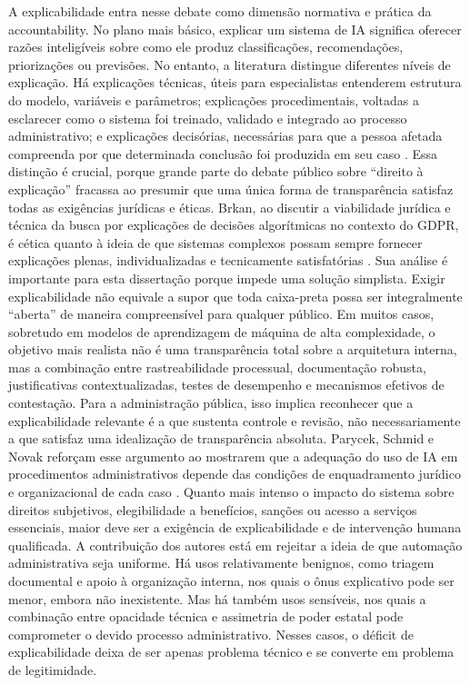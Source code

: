 \documentclass[12pt,a4paper]{article}
\begin{document}
A explicabilidade entra nesse debate como dimensão normativa e prática da accountability. No plano mais básico, explicar um sistema de IA significa oferecer razões inteligíveis sobre como ele produz classificações, recomendações, priorizações ou previsões. No entanto, a literatura distingue diferentes níveis de explicação. Há explicações técnicas, úteis para especialistas entenderem estrutura do modelo, variáveis e parâmetros; explicações procedimentais, voltadas a esclarecer como o sistema foi treinado, validado e integrado ao processo administrativo; e explicações decisórias, necessárias para que a pessoa afetada compreenda por que determinada conclusão foi produzida em seu caso \autocite{brkan2020legal} \autocite{parycek2023artificial}. Essa distinção é crucial, porque grande parte do debate público sobre “direito à explicação” fracassa ao presumir que uma única forma de transparência satisfaz todas as exigências jurídicas e éticas.
Brkan, ao discutir a viabilidade jurídica e técnica da busca por explicações de decisões algorítmicas no contexto do GDPR, é cética quanto à ideia de que sistemas complexos possam sempre fornecer explicações plenas, individualizadas e tecnicamente satisfatórias \autocite{brkan2020legal}. Sua análise é importante para esta dissertação porque impede uma solução simplista. Exigir explicabilidade não equivale a supor que toda caixa-preta possa ser integralmente “aberta” de maneira compreensível para qualquer público. Em muitos casos, sobretudo em modelos de aprendizagem de máquina de alta complexidade, o objetivo mais realista não é uma transparência total sobre a arquitetura interna, mas a combinação entre rastreabilidade processual, documentação robusta, justificativas contextualizadas, testes de desempenho e mecanismos efetivos de contestação. Para a administração pública, isso implica reconhecer que a explicabilidade relevante é a que sustenta controle e revisão, não necessariamente a que satisfaz uma idealização de transparência absoluta.
Parycek, Schmid e Novak reforçam esse argumento ao mostrarem que a adequação do uso de IA em procedimentos administrativos depende das condições de enquadramento jurídico e organizacional de cada caso \autocite{parycek2023artificial}. Quanto mais intenso o impacto do sistema sobre direitos subjetivos, elegibilidade a benefícios, sanções ou acesso a serviços essenciais, maior deve ser a exigência de explicabilidade e de intervenção humana qualificada. A contribuição dos autores está em rejeitar a ideia de que automação administrativa seja uniforme. Há usos relativamente benignos, como triagem documental e apoio à organização interna, nos quais o ônus explicativo pode ser menor, embora não inexistente. Mas há também usos sensíveis, nos quais a combinação entre opacidade técnica e assimetria de poder estatal pode comprometer o devido processo administrativo. Nesses casos, o déficit de explicabilidade deixa de ser apenas problema técnico e se converte em problema de legitimidade.
\end{document}
